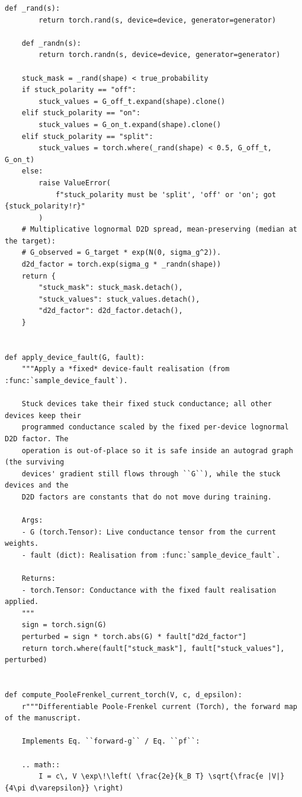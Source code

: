 \begin{lstlisting}[caption={mnn\_torch/effects.py},label={lst:mnn-src-effects}]
    def _rand(s):
        return torch.rand(s, device=device, generator=generator)

    def _randn(s):
        return torch.randn(s, device=device, generator=generator)

    stuck_mask = _rand(shape) < true_probability
    if stuck_polarity == "off":
        stuck_values = G_off_t.expand(shape).clone()
    elif stuck_polarity == "on":
        stuck_values = G_on_t.expand(shape).clone()
    elif stuck_polarity == "split":
        stuck_values = torch.where(_rand(shape) < 0.5, G_off_t, G_on_t)
    else:
        raise ValueError(
            f"stuck_polarity must be 'split', 'off' or 'on'; got {stuck_polarity!r}"
        )
    # Multiplicative lognormal D2D spread, mean-preserving (median at the target):
    # G_observed = G_target * exp(N(0, sigma_g^2)).
    d2d_factor = torch.exp(sigma_g * _randn(shape))
    return {
        "stuck_mask": stuck_mask.detach(),
        "stuck_values": stuck_values.detach(),
        "d2d_factor": d2d_factor.detach(),
    }


def apply_device_fault(G, fault):
    """Apply a *fixed* device-fault realisation (from :func:`sample_device_fault`).

    Stuck devices take their fixed stuck conductance; all other devices keep their
    programmed conductance scaled by the fixed per-device lognormal D2D factor. The
    operation is out-of-place so it is safe inside an autograd graph (the surviving
    devices' gradient still flows through ``G``), while the stuck devices and the
    D2D factors are constants that do not move during training.

    Args:
    - G (torch.Tensor): Live conductance tensor from the current weights.
    - fault (dict): Realisation from :func:`sample_device_fault`.

    Returns:
    - torch.Tensor: Conductance with the fixed fault realisation applied.
    """
    sign = torch.sign(G)
    perturbed = sign * torch.abs(G) * fault["d2d_factor"]
    return torch.where(fault["stuck_mask"], fault["stuck_values"], perturbed)


def compute_PooleFrenkel_current_torch(V, c, d_epsilon):
    r"""Differentiable Poole-Frenkel current (Torch), the forward map of the manuscript.

    Implements Eq. ``forward-g`` / Eq. ``pf``:

    .. math::
        I = c\, V \exp\!\left( \frac{2e}{k_B T} \sqrt{\frac{e |V|}{4\pi d\varepsilon}} \right)


\end{lstlisting}
